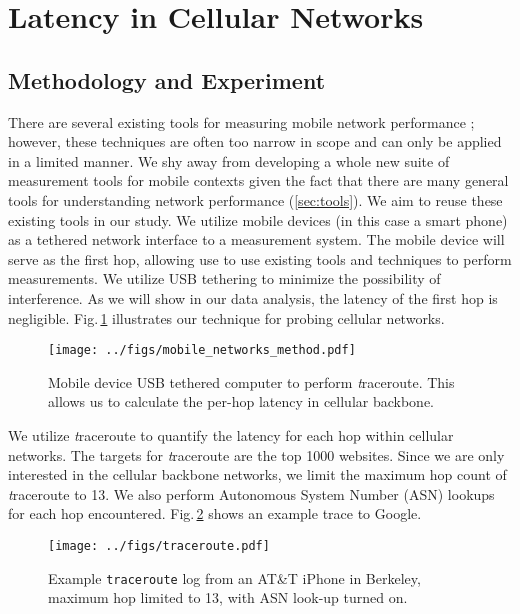 \section{Latency in Cellular Networks}
\label{sec:latency-in-cellular}

\subsection{Methodology and Experiment}
\label{sec:methodology}

There are several existing tools for measuring mobile network performance \cite{speedtest, huang2011mobiperf}; however, these techniques are often too narrow in scope and can only be applied in a limited manner. We shy away from developing a whole new suite of measurement tools for mobile contexts given the fact that there are many general tools for understanding network performance (\ref{sec:tools}). We aim to reuse these existing tools in our study. We utilize mobile devices (in this case a smart phone) as a tethered network interface to a measurement system. The mobile device will serve as the first hop, allowing use to use existing tools and techniques to perform measurements. We utilize USB tethering to minimize the possibility of interference. As we will show in our data analysis, the latency of the first hop is negligible. Fig.\,\ref{fig:mobile_networks_method} illustrates our technique for probing cellular networks.

\begin{figure}[!tbh]
  \centering
  \texttt{[image: ../figs/mobile\_networks\_method.pdf]}
  \vspace{-1em}
  \caption{Mobile device USB tethered computer to perform {\textit traceroute}. This allows us to calculate the per-hop latency in cellular backbone.}
  \label{fig:mobile_networks_method}
\end{figure}

We utilize {\textit traceroute} to quantify the latency for each hop within cellular networks. The targets for {\textit traceroute} are the top 1000 websites. Since we are only interested in the cellular backbone networks, we limit the maximum hop count of {\textit traceroute} to 13. We also perform Autonomous System Number (ASN) lookups for each hop encountered. Fig.\,\ref{fig:traceroute} shows an example trace to Google.

\begin{figure}[!htb]
  \centering
  \texttt{[image: ../figs/traceroute.pdf]}
  \vspace{-1em}
  \caption{Example \texttt{traceroute} log from an AT\&T iPhone in Berkeley, maximum hop limited to 13, with ASN look-up turned on.}
  \label{fig:traceroute}
\end{figure}


